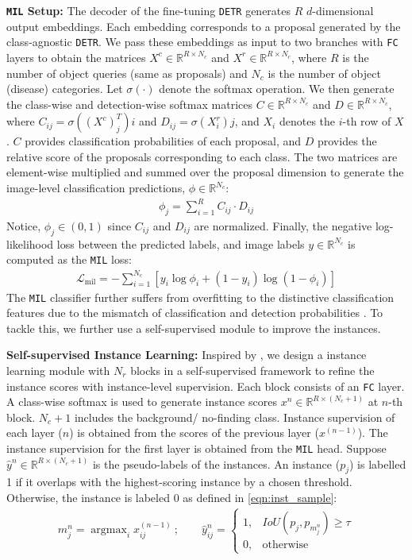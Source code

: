 \documentclass[runningheads]{llncs}
\newcommand{\myfirstpara}[1]{\par \noindent \textbf{#1:}}
\newcommand{\mypara}[1]{ \myfirstpara{#1}}
\DeclareMathOperator*{\argmax}{argmax}
\def\mil{\texttt{MIL}\xspace}
\def\detr{\texttt{DETR}\xspace}
\begin{document}
\mypara{\mil Setup}
%
The decoder of the fine-tuning \detr generates $R$ $d$-dimensional output embeddings. Each embedding corresponds to a proposal generated by the class-agnostic \detr. We pass these embeddings as input to two branches with \texttt{FC} layers to obtain the matrices $X^c \in \mathbb{R}^{R\times N_c}$ and $X^r \in \mathbb{R}^{R\times N_c}$, where $R$ is the number of object queries (same as proposals) and $N_c$ is the number of object (disease) categories. Let $\sigma(\cdot)$ denote the softmax operation. 
We then generate the class-wise and detection-wise softmax matrices $C\in\mathbb{R}^{R\times N_c}$ and $D\in\mathbb{R}^{R\times N_c}$, where $C_{ij} = \sigma((X^c)^T_j)i$ and $D_{ij} = \sigma(X^r_i)j$, and $X_i$ denotes the $i$-th row of $X$. $C$ provides classification probabilities of each proposal, and $D$ provides the relative score of the proposals corresponding to each class. The two matrices are element-wise multiplied and summed over the proposal dimension to generate the image-level classification predictions, $\phi\in\mathbb{R}^{N_c}$: 
\begin{align}
\phi_j = \sum_{i=1}^R C_{ij}\cdot D_{ij}
\end{align}
%
Notice, $\phi_j \in (0,1)$ since $C_{ij}$ and $D_{ij}$ are normalized. Finally, the negative log-likelihood loss between the predicted labels, and image labels $y\in\mathbb{R}^{N_c}$ is computed as the \mil loss:
%
\begin{align}
\mathcal{L}_\text{mil} = -\sum_{i=1}^{N_c}[{y_i \log{\phi_i}} + (1-y_i) \log{(1-\phi_i)}]   
\end{align}
The \mil classifier further suffers from overfitting to the distinctive classification features due to the mismatch of classification and detection probabilities \cite{oicr}. To tackle this, we further use a self-supervised module to improve the instances.

\mypara{Self-supervised Instance Learning}
% 
Inspired by \cite{oicr}, we design a instance learning module with $N_r$ blocks in a self-supervised framework to refine the instance scores with instance-level supervision. Each block consists of an \texttt{FC} layer. A class-wise softmax is used to generate instance scores $x^n \in \mathbb{R}^{R\times(N_c+1)}$ at $n$-th block. $N_c+1$ includes the background/ no-finding class. Instance supervision of each layer ($n$) is obtained from the scores of the previous layer ($x^{(n-1)}$). The instance supervision for the first layer is obtained from the \mil head. Suppose $\hat{y}^n \in \mathbb{R}^{R\times(N_c+1)}$ is the pseudo-labels of the instances. An instance ($p_j$) is labelled 1 if it overlaps with the highest-scoring instance by a chosen threshold. Otherwise, the instance is labeled $0$ as defined in \cref{eqn:inst_sample}:
\begin{align}
    m^n_j = \argmax_{i}{x^{(n-1)}_{ij}} ~;
    \qquad
    \hat{y}^n_{ij} =  
    \begin{cases}
    1, & IoU(p_j, p_{m^n_j}) \geq \tau\\
    0, & \text{otherwise}
    \end{cases}
    \label{eqn:inst_sample}
\end{align}
\end{document}
